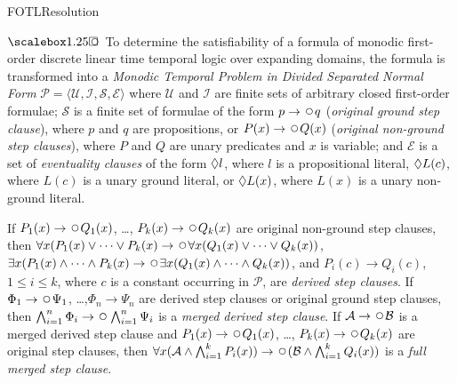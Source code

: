 \begin{entry}{FOTLResolution}

 \begin{clarifications}
$\Always\hspace*{-2ex}\Next$
%
To determine the satisfiability of a formula of monodic first-order
discrete linear time temporal logic over expanding domains, the
formula is transformed into a \emph{Monodic Temporal Problem
in Divided Separated Normal Form}
$\mathcal{P} = \langle \mathcal{U, I, S, E} \rangle$ 
where $\mathcal{U}$
and $\mathcal{I}$ 
are finite sets of arbitrary closed first-order formulae;
$\mathcal{S}$ 
is a finite set of formulae of the form
$p\rightarrow\Next q$ (\emph{original ground step clause}), 
where $p$ and $q$ are propositions, or
$P(x)\rightarrow\Next Q(x)$ (\emph{original non-ground step clauses}), 
where $P$ and $Q$ are unary predicates and $x$ is variable; and
$\mathcal{E}$  
is a set of \emph{eventuality clauses}
of the form $\Diamond l$, where $l$ is a propositional literal,
$\Diamond L(c)$, where $L(c)$ is a unary ground literal,
or
$\Diamond L(x)$, where $L(x)$ is a unary non-ground literal.

If $P_1(x)\rightarrow\Next Q_1(x)$, \dots, $P_k(x)\rightarrow\Next Q_k(x)$ are
original non-ground step clauses, then
$\forall x (P_1(x)\lor\dots\lor P_k(x)\rightarrow\Next
 \forall x (Q_1(x)\lor\dots\lor Q_k(x))$,
$\exists x (P_1(x)\land\dots\land P_k(x)\rightarrow\Next
 \exists x (Q_1(x)\land\dots\land Q_k(x))$, and
$P_i(c)\rightarrow Q_i(c)$, $1\leq i\leq k$, where $c$ is a constant
occurring in $\mathcal{P}$, are \emph{derived step clauses}.
If $\Phi_1\rightarrow\Next\Psi_1$, \dots,$\Phi_n\rightarrow\Psi_n$
are derived step clauses or original ground step clauses, then
$\bigwedge_{i=1}^n\Phi_i\rightarrow\Next\bigwedge_{i=1}^n\Psi_i$ is a
\emph{merged derived step clause}. 
If $\mathcal{A}\rightarrow\Next\mathcal{B}$ is a merged derived step
clause and $P_1(x)\rightarrow\Next Q_1(x)$, \dots,
$P_k(x)\rightarrow\Next Q_k(x)$ are original step clauses,
then $\forall x (\mathcal{A}\land\bigwedge_{i=1}^k P_i(x))
\rightarrow\Next (\mathcal{B}\land\bigwedge_{i=1}^k Q_i(x))$
is a \emph{full merged step clause}.
\end{clarifications}


\end{entry}
